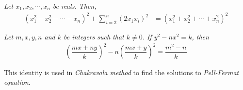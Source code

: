 \documentclass[main.tex]{subfile}
\begin{document}
\begin{appendix}
	\begin{identity}\slshape\label{id:euleraida}
		Let $x_1,x_2,\cdots,x_n$ be reals. Then,
		\begin{align*}
			(x_1^2-x_2^2-\cdots-x_n)^2 + \sum_{i=2}^{n}(2x_1x_i)^2 & = (x_1^2+x_2^2+\cdots+x_n^2)^2
		\end{align*}
	\end{identity}

	\begin{identity}\slshape
		Let $m,x,y,n$ and $k$ be integers such that $k \neq 0$. If $y^2-nx^2=k$, then
		\begin{align*}
			\left( \dfrac{mx+ny}{k}\right) ^2-n\left( \dfrac{mx+y}{k}\right)^2= \dfrac{m^2-n}{k}
		\end{align*}
	\end{identity}
	This identity is used in {\it Chakravala method} to find the solutions to {\it Pell-Fermat equation}.
\end{appendix}
\end{document}
